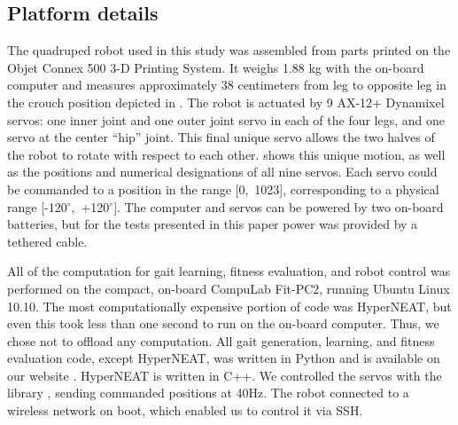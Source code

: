 \subsection{Platform details}






The quadruped robot used in this study was assembled from parts
printed on the Objet Connex 500 3-D Printing System. It weighs 1.88 kg
with the on-board computer and measures approximately 38 centimeters
from leg to opposite leg in the crouch position depicted in
. The robot is actuated by 9 AX-12+
Dynamixel servos: one inner joint and one outer joint servo in each of
the four legs, and one servo at the center ``hip'' joint.  This final
unique servo allows the two halves of the robot to rotate with respect
to each other.  shows this unique motion, as well
as the positions and numerical designations of all nine servos.  Each
servo could be commanded to a position in the range [0,~1023],
corresponding to a physical range [-120$^{\circ}$,~+120$^{\circ}$].
The computer and servos can be powered by two on-board batteries, but
for the tests presented in this paper power was provided by a tethered
cable.

All of the computation for gait learning, fitness evaluation, and
robot control was performed on the compact, on-board CompuLab Fit-PC2,
running Ubuntu Linux 10.10. 
The most computationally expensive portion of code was HyperNEAT, but even
this took less than one second to run on the on-board computer. Thus,
we chose not to offload any computation.
All gait generation, learning, and fitness
evaluation code, except HyperNEAT, was written in Python and is
available on our website \citep{quadratotWeb}.  HyperNEAT is written in
C++.  We controlled the servos with the  library
\citep{pydynamixel}, sending commanded positions at 40Hz.  The robot
connected to a wireless network on boot, which enabled us to control
it via SSH.


